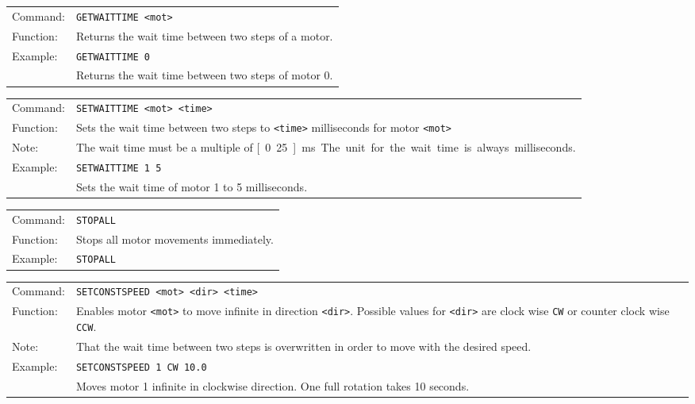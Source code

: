 \vspace{\vdistace}

\begin{table}[!htbp]
  \begin{tabularx}{\textwidth}{lX}
    Command:  & \texttt{GETWAITTIME <mot>}\\
    Function: & Returns the wait time between two steps of a motor.\\
    Example:  & \texttt{GETWAITTIME 0}\\
              & Returns the wait time between two steps of motor 0.
  \end{tabularx}
\end{table}

\vspace{\vdistace}

\begin{table}[!htbp]
  \begin{tabularx}{\textwidth}{lX}
    Command:  & \texttt{SETWAITTIME <mot> <time>}\\
    Function: & Sets the wait time between two steps to \texttt{<time>} milliseconds
                for motor \texttt{<mot>}\\
    Note:     & The wait time must be a multiple of \unit[0.25]{ms}. The unit for the wait time
                is always milliseconds.\\
    Example:  & \texttt{SETWAITTIME 1 5}\\
              & Sets the wait time of motor 1 to 5 milliseconds.
  \end{tabularx}
\end{table}

\vspace{\vdistace}

\begin{table}[!htbp]
  \begin{tabularx}{\textwidth}{lX}
    Command:  & \texttt{STOPALL}\\
    Function: & Stops all motor movements immediately.\\
    Example:  & \texttt{STOPALL}
  \end{tabularx}
\end{table}

\vspace{\vdistace}

\begin{table}[!htbp]
  \begin{tabularx}{\textwidth}{lX}
    Command:  & \texttt{SETCONSTSPEED <mot> <dir> <time>}\\
    Function: & Enables motor \texttt{<mot>} to move infinite in direction \texttt{<dir>}.
                Possible values for \texttt{<dir>} are clock wise \texttt{CW} or
                counter clock wise \texttt{CCW}. \\
    Note:     & That the wait time between two steps is overwritten in order to move with the desired speed.\\
    Example:  & \texttt{SETCONSTSPEED 1 CW 10.0}\\
              & Moves motor 1 infinite in clockwise direction.
                One full rotation takes 10 seconds.
  \end{tabularx}
\end{table}

